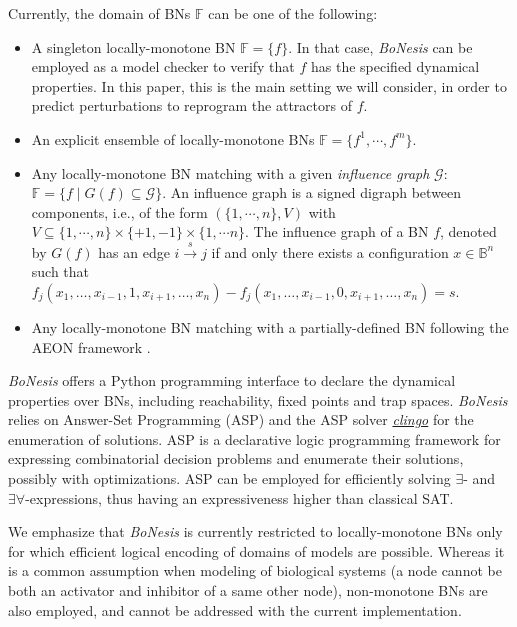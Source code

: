 \documentclass[PCJ,Unicode,screen,mode=plain]{cedram}
\begin{document}
Currently, the domain of BNs \(\mathbb F\) can be one of the following:

\begin{itemize}
\item
  A singleton locally-monotone BN \(\mathbb F=\{f\}\). In that case,
  \emph{BoNesis} can be employed as a model checker to verify that \(f\)
  has the specified dynamical properties. In this paper, this is the
  main setting we will consider, in order to predict perturbations to
  reprogram the attractors of \(f\).
\item
  An explicit ensemble of locally-monotone BNs
  \(\mathbb F=\{ f^1,\cdots, f^m \}\).
\item
  Any locally-monotone BN matching with a given \emph{influence graph}
  \(\mathcal G\): \(\mathbb F = \{ f\mid G(f)\subseteq \mathcal G\}\).
  An influence graph is a signed digraph between components, i.e., of
  the form \((\{1,\cdots,n\},V)\) with
  \(V\subseteq \{1,\cdots,n\}\times \{+1,-1\}\times \{1,\cdots n\}\).
  The influence graph of a BN \(f\), denoted by \(G(f)\) has an edge
  \(i\xrightarrow{s} j\) if and only there exists a configuration
  \(x\in\mathbb B^n\) such that
  \(f_j(x_1, \ldots, x_{i-1}, 1, x_{i+1},\ldots, x_n) - f_j(x_1, \ldots, x_{i-1}, 0, x_{i+1},\ldots, x_n) = s\).
\item
  Any locally-monotone BN matching with a partially-defined BN following
  the AEON framework \citep{Benes2021}.
\end{itemize}

\emph{BoNesis} offers a Python programming interface to declare the
dynamical properties over BNs, including reachability, fixed points and
trap spaces. \emph{BoNesis} relies on Answer-Set Programming (ASP) and
the ASP solver \href{https://potassco.org/clingo}{\emph{clingo}} for the
enumeration of solutions. ASP is a declarative logic programming
framework for expressing combinatorial decision problems and enumerate
their solutions, possibly with optimizations. ASP can be employed for
efficiently solving \(\exists\)- and \(\exists\forall\)-expressions,
thus having an expressiveness higher than classical SAT.

We emphasize that \emph{BoNesis} is currently restricted to
locally-monotone BNs only for which efficient logical encoding of
domains of models are possible. Whereas it is a common assumption when
modeling of biological systems (a node cannot be both an activator and
inhibitor of a same other node), non-monotone BNs are also employed, and
cannot be addressed with the current implementation.
\end{document}
